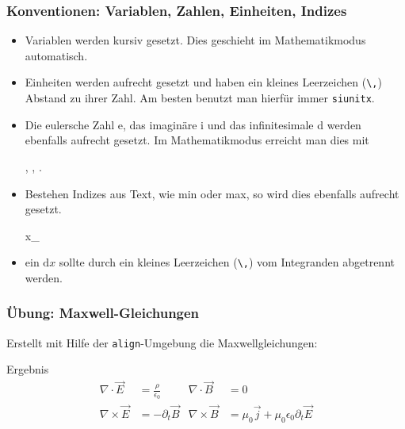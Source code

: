 \begin{frame}[fragile]
    \frametitle{Konventionen: Variablen, Zahlen, Einheiten, Indizes}
    \begin{itemize}
        \item Variablen werden kursiv gesetzt. Dies geschieht im Mathematikmodus automatisch.
        \item Einheiten werden aufrecht gesetzt und haben ein kleines Leerzeichen (\verb+\,+) Abstand zu ihrer Zahl. Am besten benutzt man hierfür immer \texttt{siunitx}.
        \item Die eulersche Zahl e, das imaginäre i und das infinitesimale d werden ebenfalls aufrecht gesetzt. Im Mathematikmodus erreicht man dies mit 
            \begin{lstverbatim}
            , , .
            \end{lstverbatim}
        \item Bestehen Indizes aus Text, wie min oder max, so wird dies ebenfalls aufrecht gesetzt.
            \begin{lstverbatim}
            x_
            \end{lstverbatim}
        \item ein $\mathrm{d}x$ sollte durch ein kleines Leerzeichen (\verb+\,+) vom Integranden abgetrennt werden.
    \end{itemize}
\end{frame}
\begin{frame}
    \frametitle{Übung: Maxwell-Gleichungen}
    Erstellt mit Hilfe der \texttt{align}-Umgebung die Maxwellgleichungen:
    \begin{block}{Ergebnis}
        \begin{align}
            \nabla \cdot \vec{E} &= \frac{\rho} {\epsilon_0} &
            \nabla \cdot \vec{B} &= 0 \\
            \nabla \times \vec{E} &= - \partial_t \vec{B} &
            \nabla \times \vec{B} &= \mu_0 \vec{j} + \mu_0 \epsilon_0 \partial_t \vec{E}
            \label{align}
        \end{align}
    \end{block}
\end{frame}

